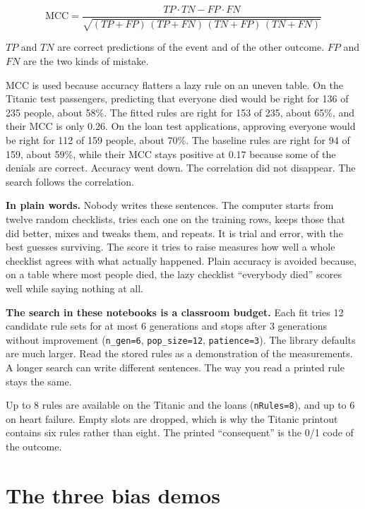 \documentclass[11pt]{article}
\newcommand{\fn}[1]{\texttt{\small #1}}
\newcommand{\pct}[1]{\mbox{#1\%}}
\begin{document}
\[
\mathrm{MCC}
=
\frac{TP \cdot TN - FP \cdot FN}
{\sqrt{(TP+FP)\,(TP+FN)\,(TN+FP)\,(TN+FN)}}
\]

\(TP\) and \(TN\) are correct predictions of the event and of the other outcome. \(FP\) and \(FN\) are the two kinds of mistake.

MCC is used because accuracy flatters a lazy rule on an uneven table. On the Titanic test passengers, predicting that everyone died would be right for 136 of 235 people, about \pct{58}. The fitted rules are right for 153 of 235, about \pct{65}, and their MCC is only 0.26. On the loan test applications, approving everyone would be right for 112 of 159 people, about \pct{70}. The baseline rules are right for 94 of 159, about \pct{59}, while their MCC stays positive at 0.17 because some of the denials are correct. Accuracy went down. The correlation did not disappear. The search follows the correlation.

\begin{plainwords}
\textbf{In plain words.} Nobody writes these sentences. The computer starts from twelve random checklists, tries each one on the training rows, keeps those that did better, mixes and tweaks them, and repeats. It is trial and error, with the best guesses surviving. The score it tries to raise measures how well a whole checklist agrees with what actually happened. Plain accuracy is avoided because, on a table where most people died, the lazy checklist ``everybody died'' scores well while saying nothing at all.
\end{plainwords}

\begin{careful}
\textbf{The search in these notebooks is a classroom budget.} Each fit tries 12 candidate rule sets for at most 6 generations and stops after 3 generations without improvement (\fn{n\_gen=6}, \fn{pop\_size=12}, \fn{patience=3}). The library defaults are much larger. Read the stored rules as a demonstration of the measurements. A longer search can write different sentences. The way you read a printed rule stays the same.
\end{careful}

Up to 8 rules are available on the Titanic and the loans (\fn{nRules=8}), and up to 6 on heart failure. Empty slots are dropped, which is why the Titanic printout contains six rules rather than eight. The printed ``consequent'' is the 0/1 code of the outcome.

\section{The three bias demos}
\label{sec:picture}
\end{document}
